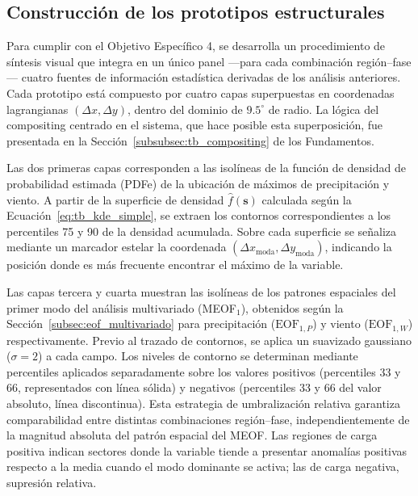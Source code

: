 \subsection{Construcción de los prototipos estructurales}\label{subsec:prototipos}
Para cumplir con el Objetivo Específico 4, se desarrolla un procedimiento de síntesis visual que integra en un único panel ---para cada combinación región--fase--- cuatro fuentes de información estadística derivadas de los análisis anteriores. Cada prototipo está compuesto por cuatro capas superpuestas en coordenadas lagrangianas $(\Delta x, \Delta y)$, dentro del dominio de $9.5^{\circ}$ de radio. La lógica del compositing centrado en el sistema, que hace posible esta superposición, fue presentada en la Sección~\ref{subsubsec:tb_compositing} de los Fundamentos.

Las dos primeras capas corresponden a las isolíneas de la función de densidad de probabilidad estimada (PDFe) de la ubicación de máximos de precipitación y viento. A partir de la superficie de densidad $\hat{f}(\mathbf{s})$ calculada según la Ecuación~\ref{eq:tb_kde_simple}, se extraen los contornos correspondientes a los percentiles 75 y 90 de la densidad acumulada. Sobre cada superficie se señaliza mediante un marcador estelar la coordenada $(\Delta x_{\text{moda}}, \Delta y_{\text{moda}})$, indicando la posición donde es más frecuente encontrar el máximo de la variable.

Las capas tercera y cuarta muestran las isolíneas de los patrones espaciales del primer modo del análisis multivariado (MEOF$_1$), obtenidos según la Sección~\ref{subsec:eof_multivariado} para precipitación ($\text{EOF}_{1,P}$) y viento ($\text{EOF}_{1,W}$) respectivamente. 
Previo al trazado de contornos, se aplica un suavizado gaussiano ($\sigma = 2$) a cada campo. Los niveles de contorno se determinan mediante percentiles aplicados separadamente sobre los valores positivos (percentiles 33 y 66, representados con línea sólida) y negativos (percentiles 33 y 66 del valor absoluto, línea discontinua). 
Esta estrategia de umbralización relativa garantiza comparabilidad entre distintas combinaciones región--fase, independientemente de la magnitud absoluta del patrón espacial del MEOF. 
Las regiones de carga positiva indican sectores donde la variable tiende a presentar anomalías positivas respecto a la media cuando el modo dominante se activa; las de carga negativa, supresión relativa.

